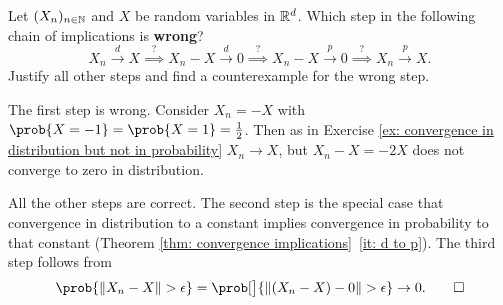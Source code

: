 
\begin{exercise}[subtitle={Find the mistake \Coffeecup}]
    Let \((X_n)_{n\in \mathbb{N}}\) and \(X\) be random variables in \(\mathbb{R}^d\).
    Which step in the following chain of implications is \textbf{wrong}?
    \[
        X_n \overset{d}\to X
        \overset{?}\implies X_n - X \overset{d}\to 0
        \overset{?}\implies X_n - X \overset{p}\to 0
        \overset{?}\implies X_n \overset{p}\to X.
    \]
    Justify all other steps and find a counterexample for the wrong step.
\end{exercise}

\begin{solution}
    The first step is wrong. Consider \(X_n = -X\) with
    \(\prob{X=-1}=\prob{X=1}=\frac12\). Then
    as in  Exercise \ref{ex: convergence in distribution but not in
    probability} \(X_n \to X\), but \(X_n - X = -2X\) does not converge to
    zero in distribution.

    All the other steps are correct. The second step is the special case
    that convergence in distribution to a constant implies convergence in
    probability to that constant (Theorem \ref{thm: convergence
    implications}~\ref{it: d to p}). The third step follows from 
    \[
        \prob{\norm{X_n - X} > \epsilon}
        =\prob[\big]{\norm{(X_n - X) - 0} > \epsilon}
        \to 0.
        \qedhere
    \]
\end{solution}
